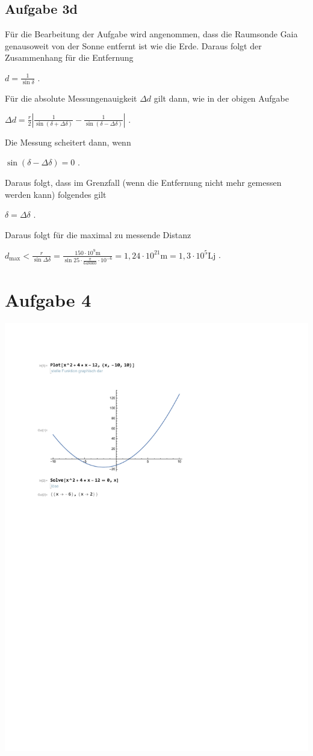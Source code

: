 \documentclass[a4paper,11pt]{article}
\begin{document}
\subsection{Aufgabe 3d}
Für die Bearbeitung der Aufgabe wird angenommen, dass die Raumsonde Gaia genausoweit von der Sonne entfernt ist wie die Erde. 
Daraus folgt der Zusammenhang für die Entfernung
\begin{center}
  $d = \frac{1}{\sin \delta}$ .
\end{center}
Für die absolute Messungenauigkeit $\Delta d$ gilt dann, wie in der obigen Aufgabe
\begin{center}
  $
    \Delta d = \frac{r}{2} \left|  \frac{1}{\sin(\delta + \Delta\delta)} - \frac{1}{\sin(\delta - \Delta\delta)} \right|
  $ .
\end{center}
Die Messung scheitert dann, wenn
\begin{center}
  $ \sin(\delta - \Delta\delta) = 0$ .
\end{center}
Daraus folgt, dass im Grenzfall (wenn die Entfernung nicht mehr gemessen werden kann) folgendes gilt
\begin{center}
  $\delta = \Delta\delta$ .
\end{center}
Daraus folgt für die maximal zu messende Distanz 
\begin{center}
  $
    d_{\mbox{max}} < \frac{r}{\sin \Delta\delta} = \frac{150 \cdot 10^9 \mbox{m}}{\sin 25 \cdot \frac{\pi}{648000} \cdot 10^{-6}}
    = 1,24 \cdot 10^{21} \mbox{m} = 1,3 \cdot 10^{5} \mbox{Lj}
  $ .
\end{center}
\section{Aufgabe 4}

  \includegraphics{./aufgabe_4.pdf}





 
\end{document}
